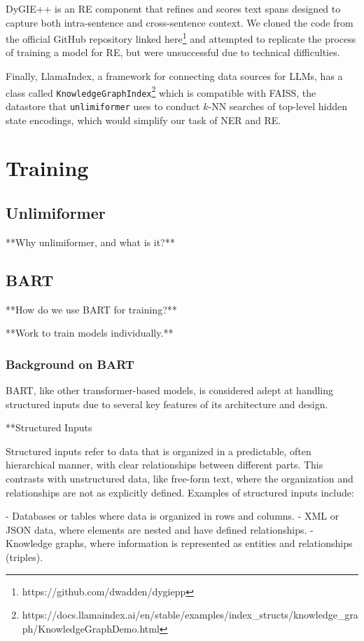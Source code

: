 \documentclass[12pt]{article}
\begin{document}
DyGIE++ is an RE component that refines and scores text spans designed to capture both intra-sentence and cross-sentence context. We cloned the code from the official GitHub repository linked here\footnote{https://github.com/dwadden/dygiepp} and attempted to replicate the process of training a model for RE, but were unsuccessful due to technical difficulties. 

Finally, LlamaIndex, a framework for connecting data sources for LLMs, has a class called \texttt{KnowledgeGraphIndex}\footnote{https://docs.llamaindex.ai/en/stable/examples/index\_structs/knowledge\_graph/KnowledgeGraphDemo.html} which is compatible with FAISS, the datastore that \texttt{unlimiformer} uses to conduct $k$-NN searches of top-level hidden state encodings, which would simplify our task of NER and RE.

\section{Training}

\subsection*{Unlimiformer}
**Why unlimiformer, and what is it?**

\subsection*{BART}
**How do we use BART for training?**

**Work to train models individually.**
\subsubsection{Background on BART}
BART, like other transformer-based models, is considered adept at handling structured inputs due to several key features of its architecture and design.

**Structured Inputs

Structured inputs refer to data that is organized in a predictable, often hierarchical manner, with clear relationships between different parts. This contrasts with unstructured data, like free-form text, where the organization and relationships are not as explicitly defined. Examples of structured inputs include:

- Databases or tables where data is organized in rows and columns.
- XML or JSON data, where elements are nested and have defined relationships.
- Knowledge graphs, where information is represented as entities and relationships (triples).
\end{document}
